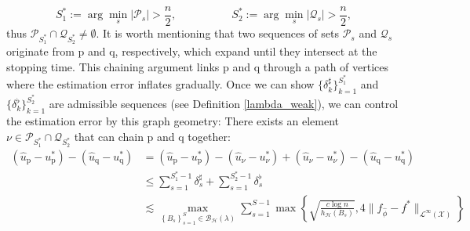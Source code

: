\documentclass[
  12pt]{article}
\begin{document}
$$S_1^*:=\arg\min_s \left|\mathcal{P}_s\right|>\frac{n}{2}, \quad\quad\quad\quad\quad S_2^*:= \arg\min_s  \left|\mathcal{Q}_s\right|>\frac{n}{2},$$
thus $\mathcal{P}_{S_1^*} \cap \mathcal{Q}_{S_2^*} \neq \emptyset$. It is worth mentioning that two sequences of sets  $\mathcal{P}_s$ and $\mathcal{Q}_s$ originate from $\mathrm{p}$ and $\mathrm{q}$, respectively, which expand until they intersect at the stopping time. This chaining argument links $\mathrm{p}$ and $\mathrm{q}$ through a path of vertices where the estimation error inflates gradually. Once we can show $\{\delta^\sharp_k\}_{k=1}^{S_1^*}$ and $\{\delta^\flat_k\}_{k=1}^{S_2^*}$ are admissible sequences (see Definition \ref{lambda_weak}), we can control the estimation error by this graph geometry: There exists an element $\nu \in \mathcal{P}_{S_1^*} \cap \mathcal{Q}_{S_2^*}$ that can chain $\mathrm{p}$ and $\mathrm{q}$ together:
\begin{align}
\left(\widehat{u}_\mathrm{p}-u^*_\mathrm{p}\right)-\left(\widehat{u}_\mathrm{q}-u^*_\mathrm{q}\right) & =\left(\widehat{u}_\mathrm{p}-u^*_\mathrm{p}\right)-\left(\widehat{u}_\nu-u^*_\nu\right)+\left(\widehat{u}_\nu-u^*_\nu\right)-\left(\widehat{u}_\mathrm{q}-u^*_\mathrm{q}\right) \nonumber\\
& \leq \sum_{s=1}^{S_1^*-1} \delta^\sharp_s+\sum_{s=1}^{S_2^*-1} \delta^\flat_s \nonumber\\
& \lesssim \max _{\left\{B_s\right\}_{s=1}^S \in \mathcal{B}_{\mathcal{H}}(\lambda)}  \sum_{s=1}^{S-1}  \max\left\{\sqrt{\frac{c \log n}{h_{\mathcal{H}}(B_s)}}, 4\|f_{\widehat{\phi}}-f^*\|_{\mathcal{L}^\infty(\mathcal{X})}\right\} \label{diameter_bound}
\end{align}
\end{document}
